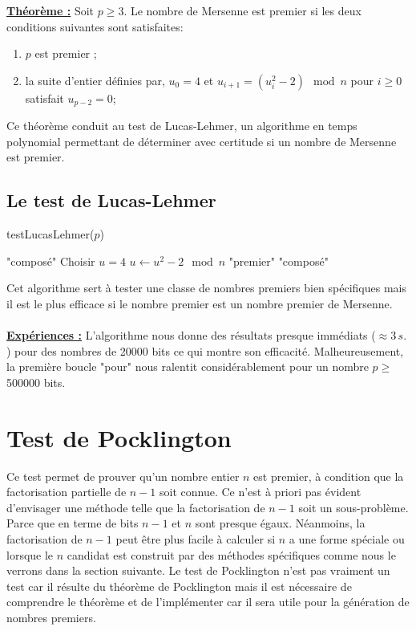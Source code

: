 \underline{\textbf{Théorème :}}
Soit $p \geq 3$. Le nombre de Mersenne est premier si les deux conditions suivantes sont satisfaites:
\begin{enumerate}[label=\roman*)]
 \item $ p $ est premier ;
 \item  la suite d’entier définies par, $u_0=4$ et  $u_{i+1}=(u_i^2 -2)\mod n$ pour $i \geq 0$ satisfait $u_{p-2}=0 $;
\end{enumerate}

Ce théorème conduit au test de Lucas-Lehmer, un algorithme en temps polynomial permettant de déterminer avec certitude si un nombre de Mersenne est premier. 

\clearpage

\subsection{Le test de Lucas-Lehmer}

\begin{algorithm}
\caption{testLucasLehmer($p$)}
\begin{algorithmic}[1]
 \Return "composé" 
\EndIf
\EndFor
\State Choisir $u=4$ 
\State $u\leftarrow u^2-2 \mod n$
\EndFor
{} \Return "premier" 
\EndIf
\State \Return "composé"
\end{algorithmic}
\end{algorithm}
Cet algorithme sert à tester une classe de nombres premiers bien spécifiques mais il est le plus efficace si le nombre premier est un nombre premier de Mersenne. \\
\\ \underline{\textbf{Expériences :}}
L'algorithme nous donne des résultats presque immédiats ($\approx 3\, s.$) pour des nombres de 20000 bits ce qui montre son efficacité. Malheureusement, la première boucle "pour" nous ralentit considérablement pour un nombre $p\geq$ 500000 bits.

\section{Test de Pocklington}

Ce test permet de prouver qu'un nombre entier $n$ est premier, à condition que la factorisation partielle de $n-1$ soit connue. Ce n'est à priori pas évident d'envisager une méthode telle que la factorisation de $n-1$ soit un sous-problème. Parce que en terme de bits $n-1$ et $n$ sont presque égaux. Néanmoins, la factorisation de $n-1$ peut être plus facile à calculer si $n$ a une forme spéciale ou lorsque le $n$ candidat est construit par des méthodes spécifiques comme nous le verrons dans la section suivante. Le test de Pocklington n'est pas vraiment un test car il résulte du théorème de Pocklington mais il est nécessaire de comprendre le théorème et de l'implémenter car il sera utile pour la génération de nombres premiers.

